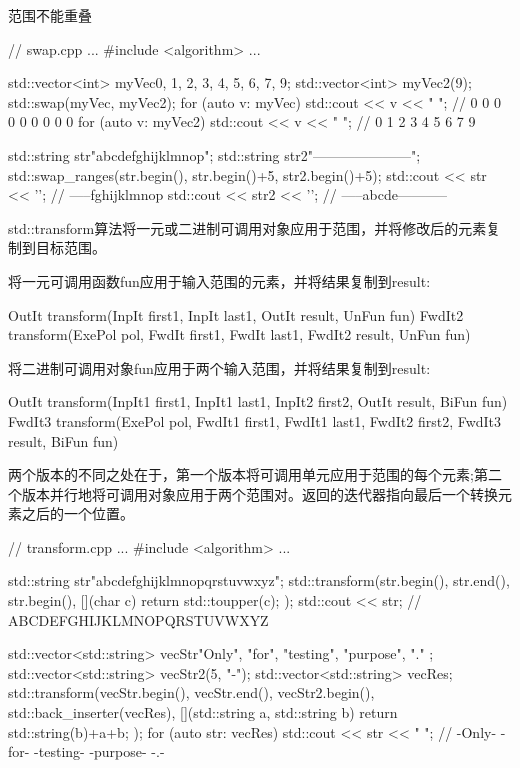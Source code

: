 \begin{myWarning}{范围不能重叠}
	

\begin{cpp}
// swap.cpp
...
#include <algorithm>
...

std::vector<int> myVec{0, 1, 2, 3, 4, 5, 6, 7, 9};
std::vector<int> myVec2(9);
std::swap(myVec, myVec2);
for (auto v: myVec) std::cout << v << " "; // 0 0 0 0 0 0 0 0 0
for (auto v: myVec2) std::cout << v << " "; // 0 1 2 3 4 5 6 7 9

std::string str{"abcdefghijklmnop"};
std::string str2{"---------------------"};
std::swap_ranges(str.begin(), str.begin()+5, str2.begin()+5);
std::cout << str << '\n'; // -----fghijklmnop
std::cout << str2 << '\n'; // -----abcde-----------
\end{cpp}
\end{myWarning}


std::transform算法将一元或二进制可调用对象应用于范围，并将修改后的元素复制到目标范围。

将一元可调用函数fun应用于输入范围的元素，并将结果复制到result:

\begin{cpp}
OutIt transform(InpIt first1, InpIt last1, OutIt result, UnFun fun)
FwdIt2 transform(ExePol pol, FwdIt first1, FwdIt last1, FwdIt2 result, UnFun fun)
\end{cpp}

将二进制可调用对象fun应用于两个输入范围，并将结果复制到result:

\begin{cpp}
OutIt transform(InpIt1 first1, InpIt1 last1, InpIt2 first2, OutIt result,
			    BiFun fun)
FwdIt3 transform(ExePol pol, FwdIt1 first1, FwdIt1 last1,
				 FwdIt2 first2, FwdIt3 result, BiFun fun)
\end{cpp}

两个版本的不同之处在于，第一个版本将可调用单元应用于范围的每个元素;第二个版本并行地将可调用对象应用于两个范围对。返回的迭代器指向最后一个转换元素之后的一个位置。


\begin{cpp}
// transform.cpp
...
#include <algorithm>
...

std::string str{"abcdefghijklmnopqrstuvwxyz"};
std::transform(str.begin(), str.end(), str.begin(),
				[](char c){ return std::toupper(c); });
std::cout << str; // ABCDEFGHIJKLMNOPQRSTUVWXYZ

std::vector<std::string> vecStr{"Only", "for", "testing", "purpose", "." };
std::vector<std::string> vecStr2(5, "-");
std::vector<std::string> vecRes;
std::transform(vecStr.begin(), vecStr.end(),
			   vecStr2.begin(), std::back_inserter(vecRes),
			   [](std::string a, std::string b){ return std::string(b)+a+b; });
for (auto str: vecRes) std::cout << str << " ";
                             // -Only- -for- -testing- -purpose- -.-
\end{cpp}

